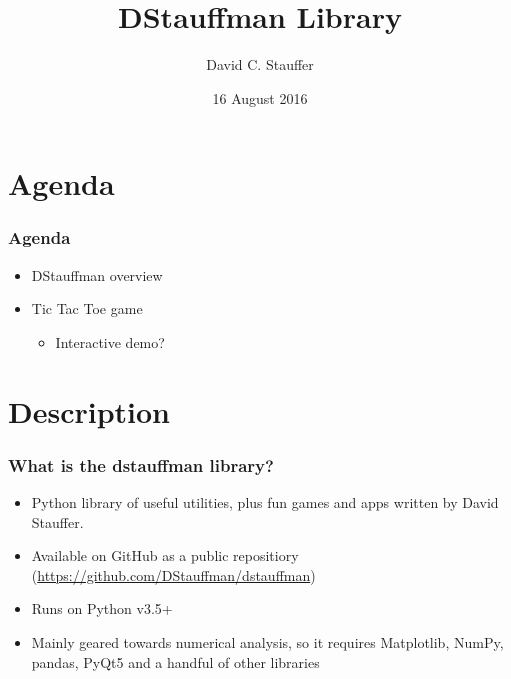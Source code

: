 \documentclass{beamer}
\title{DStauffman Library}
\author{David C. Stauffer}
\date{16 August 2016}
\begin{document}
\begin{frame}
\titlepage
\end{frame}

\section{Agenda}
\begin{frame}
	\frametitle{Agenda}
    \begin{itemize}
        \item DStauffman overview
        \item Tic Tac Toe game
        \begin{itemize}
            \item Interactive demo?
        \end{itemize}
    \end{itemize}
\end{frame}


\section{Description}
\begin{frame}
	\frametitle{What is the dstauffman library?}
    \begin{itemize}
        \item Python library of useful utilities, plus fun games and apps written by David Stauffer.
        \item Available on GitHub as a public repositiory (\url{https://github.com/DStauffman/dstauffman})
        \item Runs on Python v3.5+
        \item Mainly geared towards numerical analysis, so it requires Matplotlib, NumPy, pandas, PyQt5 and a handful of other libraries
    \end{itemize}
\end{frame}
\end{document}
